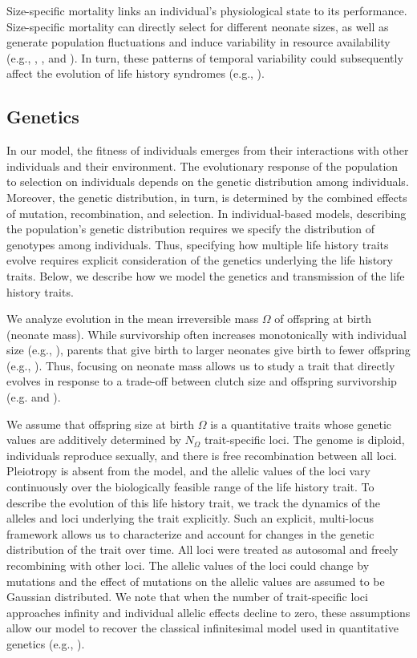 \documentclass[11pt]{article}
\begin{document}
\begin{linenumbers}
Size-specific mortality links an individual's physiological state to its performance. Size-specific mortality can directly select for different neonate sizes, as well as generate population fluctuations and induce variability in resource availability (e.g.,  \citealt{stearns76}, \citealt{costantino97}, \citealt{deRoos031} and \citealt{ernande04}). In turn, these patterns of temporal variability could subsequently affect the evolution of life history syndromes (e.g., \citealt{winemiller92}).


\subsection*{Genetics}
In our model, the fitness of individuals emerges from their interactions with other individuals and their environment. The evolutionary response of the population to selection on individuals depends on the genetic distribution among individuals. Moreover, the genetic distribution, in turn, is determined by the combined effects of mutation, recombination, and selection. In individual-based models, describing the population's genetic distribution requires we specify the distribution of genotypes among individuals. Thus, specifying how multiple life history traits evolve requires explicit consideration of the genetics underlying the life history traits. Below, we describe how we model the genetics and transmission of the life history traits.

We analyze evolution in the mean irreversible mass $\Omega$ of offspring at birth (neonate mass). While survivorship often increases monotonically with individual size (e.g., \citealt{werner84}), parents that give birth to larger neonates give birth to fewer offspring (e.g., \citealt{parker86}). Thus, focusing on neonate mass allows us to study a trait that directly evolves in response to a trade-off between clutch size and offspring survivorship (e.g. \citealt{lack66} and \citealt{roff01}). 

We assume that offspring size at birth $\Omega$ is a quantitative traits whose genetic values are additively determined by $N_\Omega$ trait-specific loci. The genome is diploid, individuals reproduce sexually, and there is free recombination between all loci. Pleiotropy is absent from the model, and the allelic values of the loci vary continuously over the biologically feasible range of the life history trait. To describe the evolution of this life history trait, we track the dynamics of the alleles and loci underlying the trait explicitly. Such an explicit, multi-locus framework allows us to characterize and account for changes in the genetic distribution of the trait over time. All loci were treated as autosomal and freely recombining with other loci. The allelic values of the loci could change by mutations and the effect of mutations on the allelic values are assumed to be Gaussian distributed. We note that when the number of trait-specific loci approaches infinity and individual allelic effects decline to zero, these assumptions allow our model to recover the classical infinitesimal model used in quantitative genetics (e.g., \citealt{bulmer85b}). 


\end{linenumbers}
\end{document}
